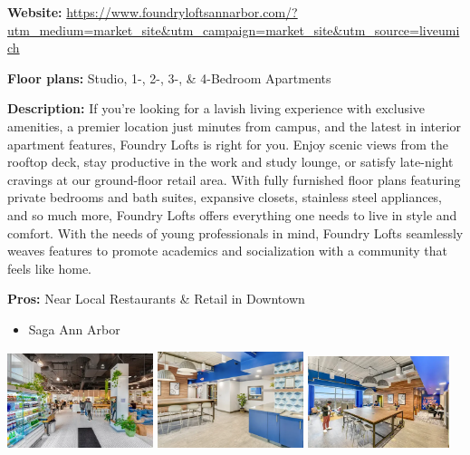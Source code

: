 \documentclass[
]{book}
\providecommand{\tightlist}{%
  \setlength{\itemsep}{0pt}\setlength{\parskip}{0pt}}
\begin{document}
\textbf{Website:} \url{https://www.foundryloftsannarbor.com/?utm_medium=market_site\&utm_campaign=market_site\&utm_source=liveumich}

\textbf{Floor plans:}
Studio, 1-, 2-, 3-, \& 4-Bedroom Apartments

\textbf{Description:}
If you're looking for a lavish living experience with exclusive amenities, a premier location just minutes from campus, and the latest in interior apartment features, Foundry Lofts is right for you. Enjoy scenic views from the rooftop deck, stay productive in the work and study lounge, or satisfy late-night cravings at our ground-floor retail area. With fully furnished floor plans featuring private bedrooms and bath suites, expansive closets, stainless steel appliances, and so much more, Foundry Lofts offers everything one needs to live in style and comfort. With the needs of young professionals in mind, Foundry Lofts seamlessly weaves features to promote academics and socialization with a community that feels like home.

\textbf{Pros:}
Near Local Restaurants \& Retail in Downtown

\begin{itemize}
\tightlist
\item
  Saga Ann Arbor
\end{itemize}

\includegraphics[width=0.32\textwidth,height=\textheight]{saga interior.jpg}
\includegraphics[width=0.32\textwidth,height=\textheight]{saga interior 2.jpg}
\includegraphics[width=0.31\textwidth,height=\textheight]{saga interior 3.jpg}
\end{document}
